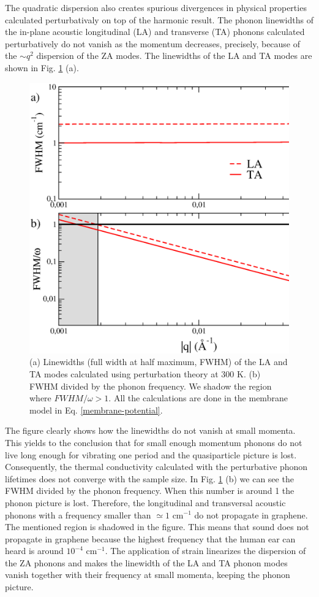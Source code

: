 The quadratic dispersion also creates spurious divergences in physical properties calculated perturbativaly on top of 
the harmonic result. The phonon linewidths of the in-plane acoustic longitudinal (LA) and transverse (TA) phonons 
calculated perturbatively do not vanish as the momentum decreases\cite{paulatto2013anharmonic}, precisely, because of 
the $\sim q^2$ dispersion of the ZA modes\cite{bonini2012acoustic}. The linewidths of the LA and TA modes are shown 
in Fig. \ref{lata-harmonic-lw} (a). 
\begin{figure}[h]
\includegraphics[width=0.8\linewidth]{Figures/lw-graphene-harmonic.eps}
	\caption[Graphene linewidths calculated within perturbation theory]{(a) Linewidths (full width at half 
	maximum, FWHM) of the LA and TA modes calculated using perturbation theory at 300 K. (b) FWHM divided by the 
	phonon frequency. We shadow the region where $FWHM/\omega>1$. All the calculations are done in the membrane 
	model in Eq. \ref{membrane-potential}.}
\label{lata-harmonic-lw}
\end{figure}
The figure clearly shows how the linewidths do not vanish at small momenta. This yields to the conclusion that for 
small enough momentum phonons do not live long enough for vibrating one period and the quasiparticle picture is lost.
Consequently, the thermal conductivity calculated with the perturbative phonon 
lifetimes\cite{fugallo2013ab,fugallo2014thermal} does not converge with the sample size\cite{bonini2012acoustic}. In 
Fig. \ref{lata-harmonic-lw} (b) we can see the FWHM divided by the phonon frequency. When this number is around 1 the 
phonon picture is lost. Therefore, the longitudinal and transversal acoustic phonons with a frequency smaller than 
$\simeq1$ cm$^{-1}$ do not propagate in graphene. The mentioned region is shadowed in the figure. This means that 
sound does not propagate in graphene because the highest frequency that the human ear can heard is around $10^{-4}$ 
cm$^{-1}$. The application of strain linearizes the dispersion of the ZA phonons and makes the linewidth of the LA 
and TA phonon modes vanish together with their frequency at small momenta, keeping the phonon 
picture\cite{bonini2012acoustic}. \\

